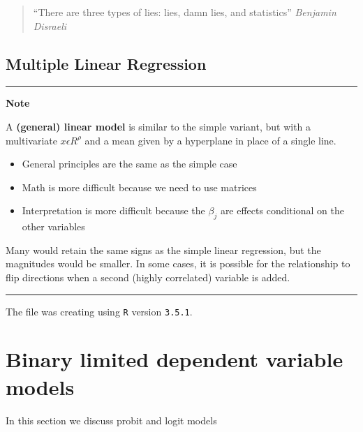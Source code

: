 \documentclass[]{book}
\providecommand{\tightlist}{%
  \setlength{\itemsep}{0pt}\setlength{\parskip}{0pt}}
\begin{document}
\begin{quote}
``There are three types of lies: lies, damn lies, and statistics''
\emph{Benjamin Disraeli}
\end{quote}

\hypertarget{multiple-linear-regression}{%
\section{Multiple Linear Regression}\label{multiple-linear-regression}}

\begin{center}\rule{0.5\linewidth}{\linethickness}\end{center}

\textbf{Note}

A \textbf{(general) linear model} is similar to the simple variant, but
with a multivariate \(x \epsilon \!R^{\rho}\) and a mean given by a
hyperplane in place of a single line.

\begin{itemize}
\tightlist
\item
  General principles are the same as the simple case
\item
  Math is more difficult because we need to use matrices
\item
  Interpretation is more difficult because the \(\beta_{j}\) are effects
  conditional on the other variables
\end{itemize}

Many would retain the same signs as the simple linear regression, but
the magnitudes would be smaller. In some cases, it is possible for the
relationship to flip directions when a second (highly correlated)
variable is added.

\begin{center}\rule{0.5\linewidth}{\linethickness}\end{center}

The file was creating using \texttt{R} version \texttt{3.5.1}.

\hypertarget{binarymodels}{%
\chapter{Binary limited dependent variable models}\label{binarymodels}}

In this section we discuss probit and logit models


\end{document}
